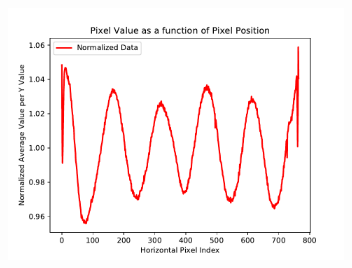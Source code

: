 \documentclass[preprint]{aastex62}
\begin{document}
        \begin{figure}
          \centering
            \includegraphics[width=3.5in]{../images/spectrograph_cropnorm_fit.pdf}
            \caption{}
          \label{fig:spectrograph_cropnorm_fit}
        \end{figure}
    
\end{document}
